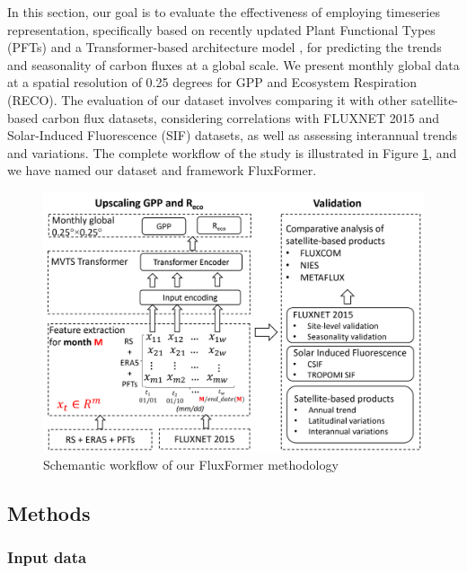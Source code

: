 In this section, our goal is to evaluate the effectiveness of employing timeseries representation, specifically based on recently updated Plant Functional Types (PFTs) \citep{harper202229} and a Transformer-based architecture model \citep{zerveas2021transformer}, for predicting the trends and seasonality of carbon fluxes at a global scale. We present monthly global data at a spatial resolution of 0.25 degrees for GPP and Ecosystem Respiration (RECO). The evaluation of our dataset involves comparing it with other satellite-based carbon flux datasets, considering correlations with FLUXNET 2015 and Solar-Induced Fluorescence (SIF) datasets, as well as assessing interannual trends and variations. The complete workflow of the study is illustrated in Figure \ref{fig:chap6_fig1}, and we have named our dataset and framework FluxFormer.

\begin{figure}[tbh!]
    \centering
    \includegraphics[width=\textwidth]{figs/chap6/workflow.png}
    \caption[Schemantic workflow of our FluxFormer methodology]{Schemantic workflow of our FluxFormer methodology}
    \label{fig:chap6_fig1}
\end{figure}

\subsection{Methods}
\subsubsection{Input data}

